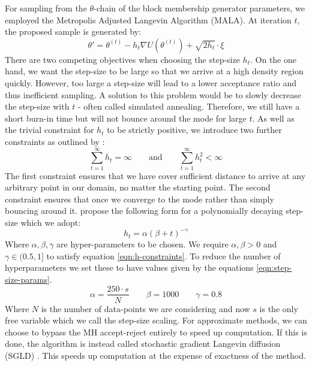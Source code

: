 For sampling from the $\theta$-chain of the block membership generator parameters, we employed the Metropolis Adjusted Langevin Algorithm (MALA). At iteration $t$, the proposed sample is generated by:
%
\begin{equation}
	\theta' = \theta^{(t)} - h_t \nabla U(\theta^{(t)}) + \sqrt{2h_t} \cdot \xi
\end{equation}
%
There are two competing objectives when choosing the step-size $h_t$. On the one hand, we want the step-size to be large so that we arrive at a high density region quickly. However, too large a step-size will lead to a lower acceptance ratio and thus inefficient sampling. A solution to this problem would be to slowly decrease the step-size with $t$ - often called simulated annealing. Therefore, we still have a short burn-in time but will not bounce around the mode for large $t$. As well as the trivial constraint for $h_t$ to be strictly positive, we introduce two further constraints as outlined by \citet{Bayesian-SGLD}:
%
\begin{equation}
	\sum_{t=1}^{\infty} h_t = \infty \qquad \textrm{and} \qquad
	\sum_{t=1}^{\infty} h_t^2 < \infty
	\label{eqn:h-constraints}
\end{equation}
%
The first constraint ensures that we have cover sufficient distance to arrive at any arbitrary point in our domain, no matter the starting point. The second constraint ensures that once we converge to the mode rather than simply bouncing around it. \citet{Bayesian-SGLD} propose the following form for a polynomially decaying step-size which we adopt:
%
\begin{equation}
	h_t = \alpha(\beta + t)^{-\gamma}
\end{equation}
%
Where $\alpha, \beta, \gamma$ are hyper-parameters to be chosen. We require $\alpha,\beta > 0$ and $\gamma \in (0.5, 1]$ to satisfy equation \ref{eqn:h-constraints}. To reduce the number of hyperparameters we set these to have values given by the equations \ref{eqn:step-size-params}.
%
\begin{equation}
	\alpha = \frac{250 \cdot s}{N} \qquad \beta = 1000 \qquad \gamma = 0.8
	\label{eqn:step-size-params}
\end{equation}
%
Where $N$ is the number of data-points we are considering and now $s$ is the only free variable which we call the step-size scaling. For approximate methods, we can choose to bypass the MH accept-reject entirely to speed up computation. If this is done, the algorithm is instead called stochastic gradient Langevin diffusion (SGLD) \cite{Bayesian-SGLD}. This speeds up computation at the expense of exactness of the method.

